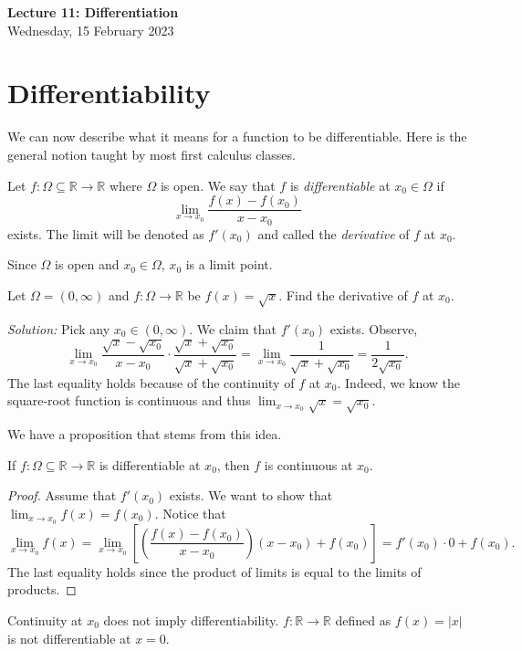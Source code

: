 \documentclass[11pt]{article}
\theoremstyle{definition}
\newcommand{\R}{\mathbb{R}}                      %
\begin{document}
\thispagestyle{empty}

\begin{center}
{\LARGE \bf Lecture 11: Differentiation}\\
{\large Wednesday, 15 February 2023}\\

\end{center}
\section{Differentiability}
We can now describe what it means for a function to be differentiable. Here is the general notion taught by most first calculus classes.\:
\begin{mdframed}[backgroundcolor = blue!10]

\vspace{+0.2cm}

 Let $f:\Omega\subseteq \R\to \R$ where $\Omega$ is open. We say that $f$ is \textit{differentiable} at $x_0\in\Omega$ if 
$$
\lim_{x\to x_0}\frac{f(x)-f(x_0)}{x-x_0}
$$
 exists. The limit will be denoted as $f'(x_0)$ and called the \textit{derivative} of $f$ at $x_0$.
\end{mdframed}
\note Since $\Omega$ is open and $x_0\in\Omega$, $x_0$ is a limit point.

\ex Let $\Omega=(0,\infty)$ and $f:\Omega\to \R$ be $f(x)=\sqrt{x}$. Find the derivative of $f$ at $x_0$.

\textit{Solution:} Pick any $x_0\in(0,\infty)$. We claim that $f'(x_0)$ exists. Observe,
$$
\lim_{x\to x_0}\frac{\sqrt{x}-\sqrt{x_0}}{x-x_0}\cdot\frac{\sqrt{x}+\sqrt{x_0}}{\sqrt{x}+\sqrt{x_0}}=\lim_{x\to x_0}\frac{1}{\sqrt{x}+\sqrt{x_0}}=\frac{1}{2\sqrt{x_0}}.
$$
The last equality holds because of the continuity of $f$ at $x_0$. Indeed, we know the square-root function is continuous and thus $\lim_{x\to x_0}\sqrt{x}=\sqrt{x_0}$.

We have a proposition that stems from this idea.

\prop If $f:\Omega\subseteq \R\to\R$ is differentiable at $x_0$, then $f$ is continuous at $x_0$.

\begin{proof}
    Assume that $f'(x_0)$ exists. We want to show that $\lim_{x\to x_0} f(x)=f(x_0)$. Notice that
    $$
    \lim_{x\to x_0} f(x)=\lim_{x\to x_0} \left[\left(\frac{f(x)-f(x_0)}{x-x_0} \right)(x-x_0)+f(x_0)\right]=f'(x_0)\cdot 0 +f(x_0).
    $$
    The last equality holds since the product of limits is equal to the limits of products.
\end{proof}
\note Continuity at $x_0$ does not imply differentiability.
\ex $f:\R\to\R$ defined as $f(x)=|x|$ is not differentiable at $x=0$.
\end{document}
